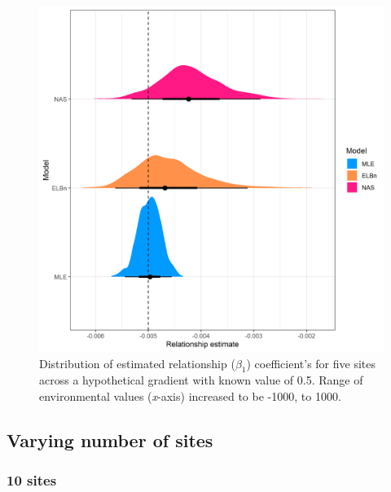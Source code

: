 \documentclass[
]{article}
\begin{document}
\newpage

\begin{figure}
\centering
\includegraphics{figures/PLB_large_x_relationship_density.png}
\caption{Distribution of estimated relationship (\(\beta_1\))
coefficient's for five sites across a hypothetical gradient with known
value of 0.5. Range of environmental values (\emph{x}-axis) increased to
be -1000, to 1000.}
\end{figure}

\newpage

\hypertarget{varying-number-of-sites}{%
\subsection{Varying number of sites}\label{varying-number-of-sites}}

\hypertarget{sites}{%
\subsubsection{10 sites}\label{sites}}
\end{document}
